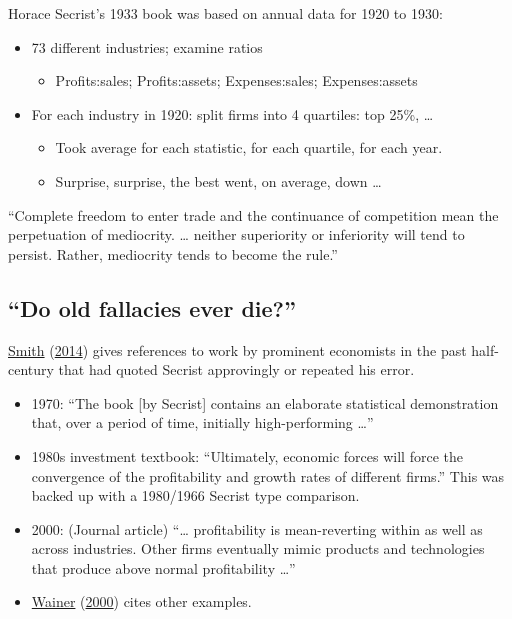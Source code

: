 \documentclass[
  10pt,
  b5paper]{book}
\providecommand{\tightlist}{%
  \setlength{\itemsep}{0pt}\setlength{\parskip}{0pt}}
\begin{document}
Horace Secrist's 1933 book was based on annual data for 1920 to 1930:

\begin{itemize}
\tightlist
\item
  73 different industries; examine ratios

  \begin{itemize}
  \tightlist
  \item
    Profits:sales; Profits:assets; Expenses:sales; Expenses:assets
  \end{itemize}
\item
  For each industry in 1920: split firms into 4 quartiles: top 25\%, \ldots{}

  \begin{itemize}
  \tightlist
  \item
    Took average for each statistic, for each quartile, for each year.
  \item
    Surprise, surprise, the best went, on average, down \ldots{}
  \end{itemize}
\end{itemize}

``Complete freedom to enter trade and the continuance of competition
mean the perpetuation of mediocrity. \ldots{} neither superiority or
inferiority will tend to persist. Rather, mediocrity tends to become
the rule.''

\hypertarget{do-old-fallacies-ever-die}{%
\subsection*{``Do old fallacies ever die?''}\label{do-old-fallacies-ever-die}}

\protect\hyperlink{ref-smith-sd}{Smith} (\protect\hyperlink{ref-smith-sd}{2014}) gives references to work by prominent economists in the past
half-century that had quoted Secrist approvingly or repeated his error.

\begin{itemize}
\tightlist
\item
  1970: ``The book {[}by Secrist{]} contains an elaborate statistical
  demonstration that, over a period of time, initially high-performing \ldots{}''
\item
  1980s investment textbook: ``Ultimately, economic forces will force
  the convergence of the profitability and growth rates of different firms.''
  This was backed up with a 1980/1966 Secrist type comparison.
\item
  2000: (Journal article) ``\ldots{} profitability is mean-reverting within
  as well as across industries. Other firms eventually mimic products
  and technologies that produce above normal profitability \ldots{}''
\item
  \protect\hyperlink{ref-wainerRegress}{Wainer} (\protect\hyperlink{ref-wainerRegress}{2000}) cites other examples.
\end{itemize}
\end{document}
